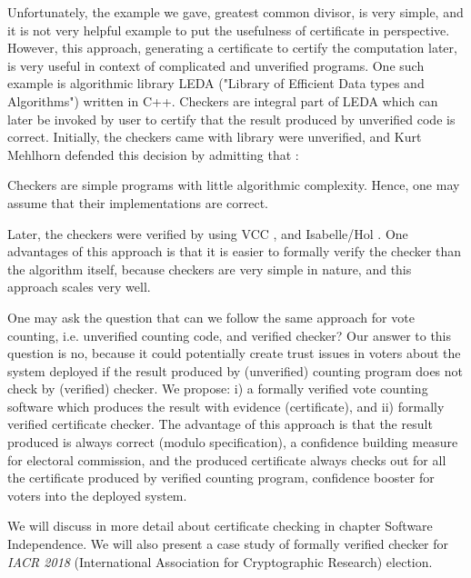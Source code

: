    
   Unfortunately, the example we gave,  greatest common divisor, is very simple, and 
   it is not 
   very helpful example to put the usefulness of certificate in perspective.
   However, this approach, generating a certificate to certify the computation later, is very useful in context 
   of complicated and unverified  programs.   One such example is algorithmic library  
   LEDA \citep{Mehlhorn:1995:LPC:204865.204889} ("Library of Efficient Data types and Algorithms") 
   written in C++.  Checkers are integral part of LEDA 
   which can later be invoked by user to certify that the result produced by unverified 
   code is correct. 
   Initially, the checkers came with library were unverified, and 
   Kurt Mehlhorn defended this decision by admitting that \citep{Alkassar2014}: 
   \begin{displayquote}
   Checkers are simple programs with little algorithmic 
   complexity. Hence, one may assume that their implementations are correct.
	\end{displayquote}   
	\noindent
    Later, the 
   checkers \citep{Alkassar2014} were verified by using VCC \citep{10.1007/978-3-642-03359-9_2}, 
   and Isabelle/Hol \citep{Nipkow:2002:IPA:1791547}.  One advantages of this approach is 
   that it is easier to formally verify the checker than the algorithm itself, because 
   checkers are very simple in nature, and this approach scales very well. 
   
   One may ask the question that can we follow the same approach for vote counting,
   i.e. unverified counting code, and verified checker?  Our answer to this question is no, because 
   it could potentially create trust issues in voters about the system deployed if 
   the result produced by (unverified) counting program does not 
   check by (verified) checker. We propose: i) a formally verified vote counting
   software which produces the result with evidence (certificate), and ii) formally verified 
   certificate checker. The advantage of this approach is that the result produced is always correct (modulo 
   specification), 
   a confidence building measure for electoral commission, and the produced certificate always checks out
   for all the certificate produced by verified counting program, confidence booster for 
   voters into the deployed system.  
   
  We will discuss in more detail about certificate checking 
  in chapter Software Independence.  We will also present a case study of 
  formally verified checker for \textit{IACR 2018} (International Association for 
  Cryptographic Research) election.
     
